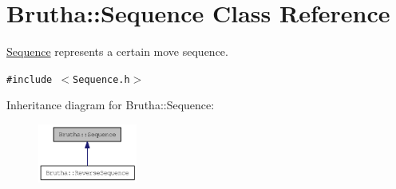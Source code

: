 \hypertarget{classBrutha_1_1Sequence}{
\section{Brutha::Sequence Class Reference}
\label{classBrutha_1_1Sequence}
}
\hyperlink{classBrutha_1_1Sequence}{Sequence} represents a certain move sequence.  


{\tt \#include $<$Sequence.h$>$}

Inheritance diagram for Brutha::Sequence:\nopagebreak
\begin{figure}[H]
\begin{center}
\leavevmode
\includegraphics[width=92pt]{classBrutha_1_1Sequence__inherit__graph}
\end{center}
\end{figure}
